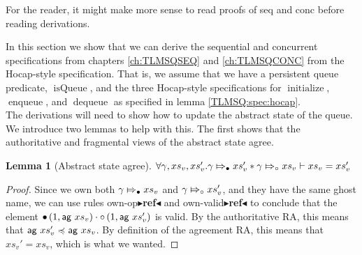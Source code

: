 \documentclass[a4paper, 10pt]{report}
\theoremstyle{definition}
\newtheorem{lemma}[theorem]{Lemma}
\newcommand{\initialise}{\operatorname{initialize}}
\newcommand{\enqueue}{\operatorname{enqueue}}
\newcommand{\dequeue}{\operatorname{dequeue}}
\newcommand{\isqueue}{\operatorname{isQueue}}
\newcommand{\absvalueList}{xs_v}
\newcommand{\abstractstatefullfrag}[2]{#1 \Mapsto_{\circ} #2}
\newcommand{\abstractstateauth}[2]{#1 \Mapsto_{\bullet} #2}
\newcommand{\todo}[1]{{\color[rgb]{.5,0,0}\textbf{$\blacktriangleright$#1$\blacktriangleleft$}}}
\begin{document}
For the reader, it might make more sense to read proofs of seq and conc before reading derivations.


In this section we show that we can derive the sequential and concurrent specifications from chapters \ref{ch:TLMSQSEQ} and \ref{ch:TLMSQCONC} from the Hocap-style specification. That is, we assume that we have a persistent queue predicate, $\isqueue$, and the three Hocap-style specifications for $\initialise$, $\enqueue$, and $\dequeue$ as specified in lemma \ref{TLMSQ:spec:hocap}.\\
The derivations will need to show how to update the abstract state of the queue. We introduce two lemmas to help with this. The first shows that the authoritative and fragmental views of the abstract state agree.
\begin{lemma}[Abstract state agree]\label{lemma:abst:agree}
  $\All \gname, \absvalueList, \absvalueList' .\\
  \abstractstateauth{\gname}{\absvalueList'} \star{} \abstractstatefullfrag{\gname}{\absvalueList} \proves \absvalueList = \absvalueList'$
\end{lemma}
\begin{proof}
  Since we own both $\abstractstateauth{\gname}{\absvalueList}$ and $\abstractstatefullfrag{\gname}{\absvalueList'}$, and they have the same ghost name, we can use rules own-op\todo{ref} and own-valid\todo{ref} to conclude that the element $\authfull (1, \aginj ~ \absvalueList) \mtimes \authfrag (1, \aginj ~ \absvalueList')$ is valid. By the authoritative RA, this means that $\aginj ~ \absvalueList' \mincl \aginj ~ \absvalueList$. By definition of the agreement RA, this means that $\absvalueList' = \absvalueList$, which is what we wanted.
\end{proof}
\end{document}
